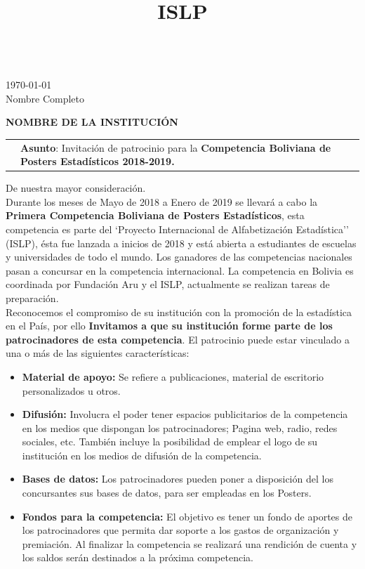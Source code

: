 \documentclass[11pt,a4paper]{article}
\title{ISLP}
\begin{document}
\hfill
\vspace{0.2cm}\\

\hspace{5.5cm} \today \\

Nombre Completo 

\textbf{NOMBRE DE LA INSTITUCIÓN}
\vspace{0.2cm}\\


\begin{tabular}{lp{10cm}}
\hspace{5cm} & \textbf{Asunto}: Invitación de patrocinio para la \textbf{Competencia Boliviana de Posters Estadísticos 2018-2019.}\\
\end{tabular}

\hfill

De nuestra mayor consideración.\\

Durante los meses de Mayo de 2018 a Enero de 2019 se llevará a cabo la \textbf{Primera Competencia Boliviana de Posters Estadísticos}, esta competencia es parte del `Proyecto Internacional de Alfabetización Estadística'' (ISLP), ésta fue lanzada a inicios de 2018 y está abierta a estudiantes de escuelas y universidades de todo el mundo. Los ganadores de las competencias nacionales pasan a concursar en la competencia internacional. La competencia en Bolivia es coordinada por Fundación Aru y el ISLP, actualmente se realizan tareas de preparación.\\


Reconocemos el compromiso de su institución con la promoción de la estadística en el País, por ello \textbf{Invitamos a que su institución forme parte de los patrocinadores de esta competencia}. El patrocinio puede estar vinculado a una o más de las siguientes características:

\begin{itemize}
\item \textbf{Material de apoyo:} Se refiere a publicaciones, material de escritorio personalizados u otros. 
\item \textbf{Difusión:} Involucra el poder tener espacios publicitarios de la competencia en los medios que dispongan los patrocinadores; Pagina web, radio, redes sociales, etc. También incluye la posibilidad de emplear el logo de su institución en los medios de difusión de la competencia.
\item \textbf{Bases de datos:} Los patrocinadores pueden poner a disposición del los concursantes sus bases de datos, para ser empleadas en los Posters.
\item \textbf{Fondos para la competencia:} El objetivo es tener un fondo de aportes de los patrocinadores que permita dar soporte a los gastos de organización y premiación. Al finalizar la competencia se realizará una rendición de cuenta y los saldos serán destinados a la próxima competencia.
\end{itemize}
\end{document}
